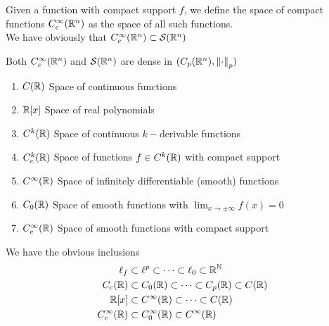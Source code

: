 \documentclass[../complete.tex]{subfiles}
\begin{document}
\begin{dfn}
	Given a function with compact support $f$, we define the space of compact functions $C_c^{\infty}(\mathbb{R}^n)$ as the space of all such functions.\\
	We have obviously that $C_c^\infty(\mathbb{R}^n)\subset\mathcal{S}(\mathbb{R}^n)$
\end{dfn}
\begin{thm}
	Both $C_c^\infty(\mathbb{R}^n)$ and $\mathcal{S}(\mathbb{R}^n)$ are dense in $(C_p(\mathbb{R}^n),\norm{\cdot}_{p})$
\end{thm}
\begin{thm}
	\begin{enumerate}
	\item $C(\mathbb{R})$ Space of continuous functions
	\item $\mathbb{R}[x]$ Space of real polynomials
	\item $C^k(\mathbb{R})$ Space of continuous $k-$derivable functions
	\item $C^k_c(\mathbb{R})$ Space of functions $f\in C^k(\mathbb{R})$ with compact support
	\item $C^\infty(\mathbb{R})$ Space of infinitely differentiable (smooth) functions
	\item $C_0(\mathbb{R})$ Space of smooth functions with $\lim_{x\to\pm\infty}f(x)=0$
	\item $C_c^\infty(\mathbb{R})$ Space of smooth functions with compact support
	\end{enumerate}
	We have the obvious inclusions
	\begin{equation*}
		\begin{aligned}
			\ell_f&\subset\ell^p\subset\cdots\subset\ell_0\subset\mathbb{R}^{\mathbb{N}}\\
			C_c(\mathbb{R})&\subset C_0(\mathbb{R})\subset\cdots\subset C_p(\mathbb{R})\subset C(\mathbb{R})\\
			\mathbb{R}[x]&\subset C^\infty(\mathbb{R})\subset\cdots\subset C(\mathbb{R})\\
			C_c^\infty(\mathbb{R})&\subset C_0^\infty(\mathbb{R})\subset C^\infty(\mathbb{R})
		\end{aligned}
	\end{equation*}
\end{thm}
\end{document}

